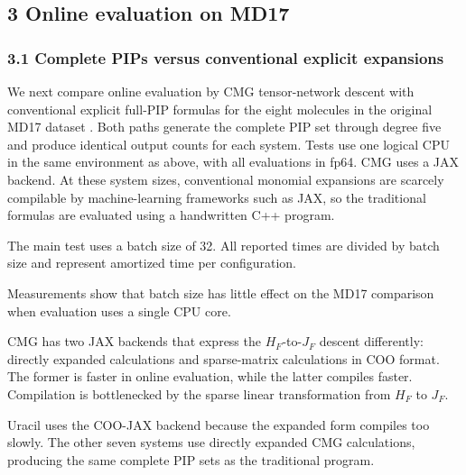 \subsection{3 Online evaluation on MD17}\label{sec:md17-evaluation}

\subsubsection{3.1 Complete PIPs versus conventional explicit expansions}\label{md17-full-pip}

We next compare online evaluation by CMG tensor-network descent with conventional explicit full-PIP formulas for the eight molecules in the original MD17 dataset \cite{Chmiela2017GDML}.
Both paths generate the complete PIP set through degree five and produce identical output counts for each system.
Tests use one logical CPU in the same environment as above, with all evaluations in fp64. CMG uses a JAX backend.
At these system sizes, conventional monomial expansions are scarcely compilable by machine-learning frameworks such as JAX, so the traditional formulas are evaluated using a handwritten C++ program.

The main test uses a batch size of 32. All reported times are divided by batch size and represent amortized time per configuration.

Measurements show that batch size has little effect on the MD17 comparison when evaluation uses a single CPU core.

CMG has two JAX backends that express the \(H_F\)-to-\(J_F\) descent differently: directly expanded calculations and sparse-matrix calculations in COO format.
The former is faster in online evaluation, while the latter compiles faster. Compilation is bottlenecked by the sparse linear transformation from \(H_F\) to \(J_F\).

Uracil uses the COO-JAX backend because the expanded form compiles too slowly. The other seven systems use directly expanded CMG calculations, producing the same complete PIP sets as the traditional program.

